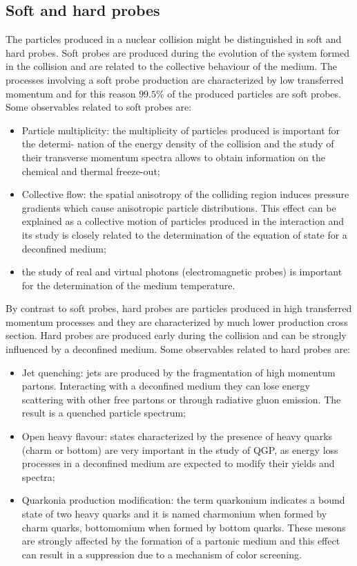 \subsection{Soft and hard probes}
The particles produced in a nuclear collision might be distinguished in soft and hard probes.
Soft probes are produced during the evolution of the system formed in the collision and are related to the collective behaviour of the medium.
The processes involving a soft probe production are characterized by low transferred momentum and for this reason $99.5\%$ of the produced particles are soft probes.
Some observables related to soft probes are:
\begin{itemize}
    \item Particle multiplicity: the multiplicity of particles produced is important for the determi- nation of the energy density of the collision and the study of their transverse momentum spectra allows to obtain information on the chemical and thermal freeze-out;
    \item Collective flow: the spatial anisotropy of the colliding region induces pressure gradients which cause anisotropic particle distributions. This effect can be explained as a collective motion of particles produced in the interaction and its study is closely related to the determination of the equation of state for a deconfined medium;
    \item the study of real and virtual photons (electromagnetic probes) is important for the determination of the medium temperature.
\end{itemize}
By contrast to soft probes, hard probes are particles produced in high transferred momentum processes and they are characterized by much lower production cross section.
Hard probes are produced early during the collision and can be strongly influenced by a deconfined medium.
Some observables related to hard probes are:
\begin{itemize}
    \item Jet quenching: jets are produced by the fragmentation of high momentum partons. Interacting with a deconfined medium they can lose energy scattering with other free partons or through radiative gluon emission. The result is a quenched particle spectrum;
    \item Open heavy flavour: states characterized by the presence of heavy quarks (charm or bottom) are very important in the study of QGP, as energy loss processes in a deconfined medium are expected to modify their yields and spectra;
    \item Quarkonia production modification: the term quarkonium indicates a bound state of two heavy quarks and it is named charmonium when formed by charm quarks, bottomomium when formed by bottom quarks. These mesons are strongly affected by the formation of a partonic medium and this effect can result in a suppression due to a mechanism of color screening.
\end{itemize}

